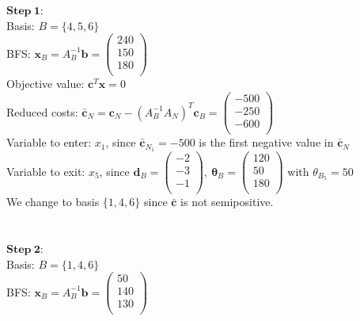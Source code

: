 \documentclass{article}
\begin{document}
$\mathbf{Step~1}$:\\
Basis: $B = \{4, 5, 6\}$\\
BFS: $\mathbf{x}_B = A_B^{-1}\mathbf{b} = 
\left(
    \begin{array}{c}
        240\\
        150\\
        180\\
    \end{array}
\right)$\\
Objective value: $\mathbf{c}^T \mathbf{x} = 0$\\
Reduced costs: $\mathbf{\bar{c}}_N = \mathbf{c}_N - (A_B^{-1} A_N)^T \mathbf{c}_B = 
\left(
    \begin{array}{c}
        -500\\
        -250\\
        -600\\
    \end{array}
\right)$\\
Variable to enter: $x_1$, since $\mathbf{\bar{c}}_{N_1} = -500$ is the first negative value in $\mathbf{\bar{c}}_N$\\
Variable to exit: $x_5$, since $\mathbf{d}_B = \left(
    \begin{array}{c}
        -2\\
        -3\\
        -1\\
    \end{array}
\right),~
\mathbf{\theta}_B = \left(
    \begin{array}{c}
        120\\
        50\\
        180\\
    \end{array}
\right)$ with $\theta_{B_5} = 50$\\
We change to basis $\{1,4,6\}$ since $\mathbf{\bar{c}}$ is not semipositive.\\
\\
\\
$\mathbf{Step~2}$:\\
Basis: $B = \{1, 4, 6\}$\\
BFS: $\mathbf{x}_B = A_B^{-1}\mathbf{b} = 
\left(
    \begin{array}{c}
        50\\
        140\\
        130\\
    \end{array}
\right)$\\
\end{document}
